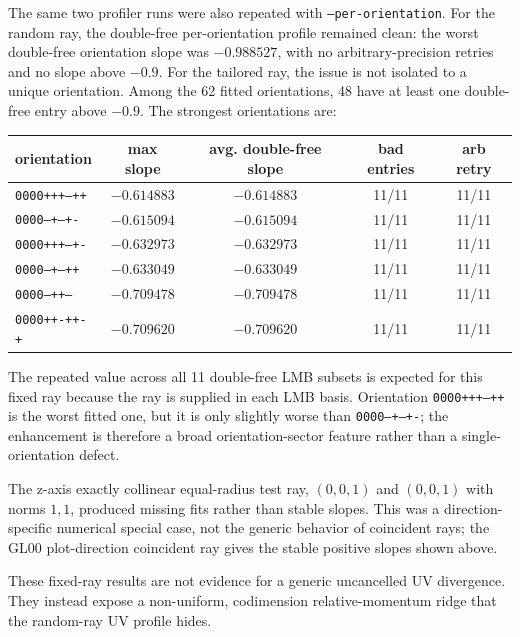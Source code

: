 \documentclass[11pt]{article}
\begin{document}
The same two profiler runs were also repeated with \texttt{--per-orientation}.
For the random ray, the double-free per-orientation profile remained clean:
the worst double-free orientation slope was $-0.988527$, with no
arbitrary-precision retries and no slope above $-0.9$.  For the tailored ray,
the issue is not isolated to a unique orientation.  Among the 62 fitted
orientations, 48 have at least one double-free entry above $-0.9$.  The
strongest orientations are:
\begin{center}
\begin{tabular}{lcccc}
\toprule
orientation & max slope & avg. double-free slope & bad entries & arb retry\\
\midrule
\texttt{0000+++--++} & $-0.614883$ & $-0.614883$ & 11/11 & 11/11\\
\texttt{0000--+--+-} & $-0.615094$ & $-0.615094$ & 11/11 & 11/11\\
\texttt{0000+++--+-} & $-0.632973$ & $-0.632973$ & 11/11 & 11/11\\
\texttt{0000--+--++} & $-0.633049$ & $-0.633049$ & 11/11 & 11/11\\
\texttt{0000---++--} & $-0.709478$ & $-0.709478$ & 11/11 & 11/11\\
\texttt{0000++-++-+} & $-0.709620$ & $-0.709620$ & 11/11 & 11/11\\
\bottomrule
\end{tabular}
\end{center}
The repeated value across all 11 double-free LMB subsets is expected for this
fixed ray because the ray is supplied in each LMB basis.  Orientation
\texttt{0000+++--++} is the worst fitted one, but it is only slightly worse
than \texttt{0000--+--+-}; the enhancement is therefore a broad
orientation-sector feature rather than a single-orientation defect.

The z-axis exactly collinear equal-radius test ray, $(0,0,1)$ and $(0,0,1)$
with norms $1,1$, produced missing fits rather than stable slopes.  This was a
direction-specific numerical special case, not the generic behavior of
coincident rays; the GL00 plot-direction coincident ray gives the stable
positive slopes shown above.

These fixed-ray results are not evidence for a generic uncancelled UV
divergence.  They instead expose a non-uniform, codimension relative-momentum
ridge that the random-ray UV profile hides.
\end{document}

